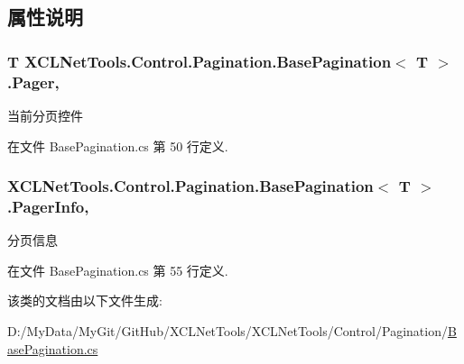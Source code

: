 \subsection{属性说明}
\hypertarget{class_x_c_l_net_tools_1_1_control_1_1_pagination_1_1_base_pagination_3_01_t_01_4_ae0cfdba3ea23387da4b851c4d695d0a0}{
\subsubsection[{Pager}]{\setlength{\rightskip}{0pt plus 5cm}T X\-C\-L\-Net\-Tools.\-Control.\-Pagination.\-Base\-Pagination$<$ T $>$.Pager\hspace{0.3cm}{\ttfamily [get]}, {\ttfamily [set]}}}\label{class_x_c_l_net_tools_1_1_control_1_1_pagination_1_1_base_pagination_3_01_t_01_4_ae0cfdba3ea23387da4b851c4d695d0a0}


当前分页控件 



在文件 Base\-Pagination.\-cs 第 50 行定义.

\hypertarget{class_x_c_l_net_tools_1_1_control_1_1_pagination_1_1_base_pagination_3_01_t_01_4_ae27d645cd692bb7471bc6236c59496a3}{
\subsubsection[{Pager\-Info}]{ X\-C\-L\-Net\-Tools.\-Control.\-Pagination.\-Base\-Pagination$<$ T $>$.Pager\-Info\hspace{0.3cm}{\ttfamily [get]}, {\ttfamily [set]}}}\label{class_x_c_l_net_tools_1_1_control_1_1_pagination_1_1_base_pagination_3_01_t_01_4_ae27d645cd692bb7471bc6236c59496a3}


分页信息 



在文件 Base\-Pagination.\-cs 第 55 行定义.



该类的文档由以下文件生成\-:\begin{DoxyCompactItemize}
\item 
D\-:/\-My\-Data/\-My\-Git/\-Git\-Hub/\-X\-C\-L\-Net\-Tools/\-X\-C\-L\-Net\-Tools/\-Control/\-Pagination/\hyperlink{_base_pagination_8cs}{Base\-Pagination.\-cs}\end{DoxyCompactItemize}
